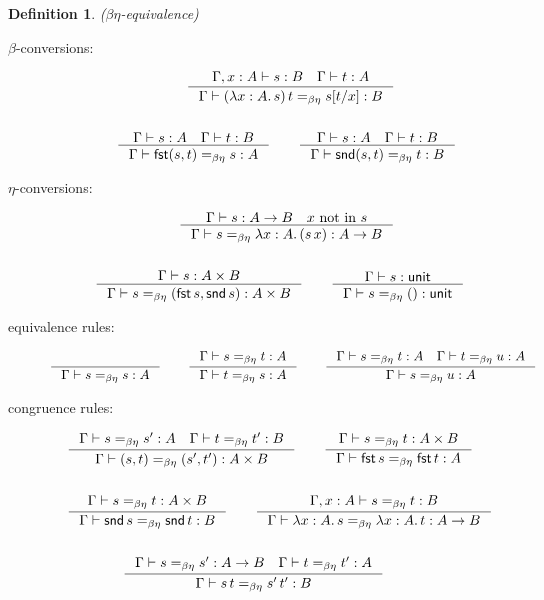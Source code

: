 \documentclass{article}
\newtheorem{defn}{Definition}[section]
\newcommand{\type}{\vdash}
\newcommand{\fst}{\mathsf{fst}\,}
\newcommand{\snd}{\mathsf{snd}\,}
\begin{document}
\begin{defn}{($\beta\eta$-equivalence)}
    \begin{description}
        \item[$\beta$-conversions:]
            \begin{align*}
                & \qquad\qquad\qquad \inference{\Gamma, x:A \type s: B \quad \Gamma \type t:A}{\Gamma \type (\lambda x:A.\, s)\, t =_{\beta\eta} s[t/x]: B}\\
                \\
                & \quad \inference{\Gamma \type s: A \quad \Gamma \type t:B}{\Gamma \type \mathsf{fst}(s, t) =_{\beta\eta} s: A}\qquad
                \inference{\Gamma \type s: A \quad \Gamma \type t:B}{\Gamma \type \mathsf{snd}(s, t) =_{\beta\eta} t: B}
            \end{align*}
        \item[$\eta$-conversions:]
            \begin{align*}
                & \qquad\qquad\qquad \inference{\Gamma \type s: A \to B \quad x \text{ not in } s}{\Gamma \type s =_{\beta\eta} \lambda x: A.\,(s\,x): A \to B}\\
                \\
                & \inference{\Gamma \type s: A \times B}{\Gamma \type s =_{\beta\eta} (\mathsf{fst}\,s, \mathsf{snd}\,s): A \times B}\qquad
                \inference{\Gamma \type s: \mathsf{unit}}{\Gamma \type s =_{\beta\eta} () : \mathsf{unit}}
            \end{align*}
        \item[equivalence rules:]
            \begin{align*}
                & \inference{}{\Gamma \type s =_{\beta\eta} s: A} \qquad
                \inference{\Gamma \type s =_{\beta\eta} t: A}{\Gamma \type t =_{\beta\eta} s: A}
                \qquad \inference{\Gamma \type s =_{\beta\eta} t: A \quad \Gamma \type t =_{\beta\eta} u: A}{\Gamma \type s =_{\beta\eta} u: A}
            \end{align*}
        \item[congruence rules:]
            \begin{align*}
                & \inference{\Gamma \type s =_{\beta\eta} s': A \quad \Gamma \type t =_{\beta\eta} t': B}{\Gamma \type (s,t) =_{\beta\eta} (s',t'): A \times B}
                \qquad\inference{\Gamma \type s =_{\beta\eta} t : A \times B}{\Gamma \type \fst s =_{\beta\eta} \fst t: A} \\
                \\
                & \inference{\Gamma \type s =_{\beta\eta} t : A \times B}{\Gamma \type \snd s =_{\beta\eta} \snd t: B} \qquad
                \inference{\Gamma, x: A \type s =_{\beta\eta} t: B}{\Gamma \type \lambda x:A.\, s =_{\beta\eta} \lambda x:A.\, t: A \to B} \\
                \\
                & \qquad\qquad \inference{\Gamma\type s =_{\beta\eta} s': A \to B \quad \Gamma\type t =_{\beta\eta} t': A}{\Gamma\type s\,t =_{\beta\eta} s'\,t': B}
            \end{align*}
    \end{description}
\end{defn}
\end{document}
